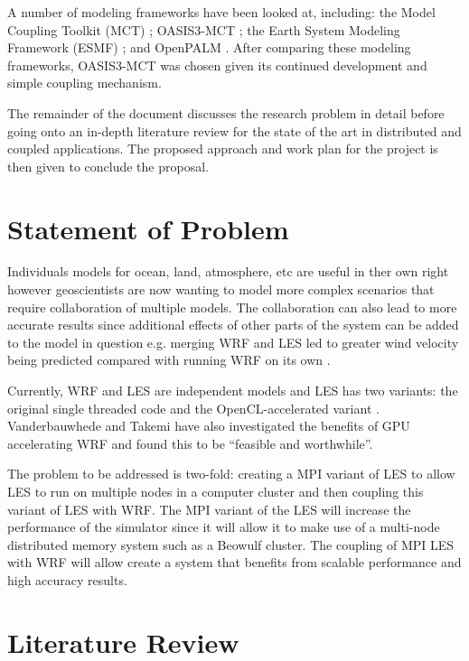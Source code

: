\documentclass{acm_proc_article-sp}
\renewcommand{\_}{\underscore\hspace{0pt}}
\begin{document}
A number of modeling frameworks have been looked at, including: the Model
Coupling Toolkit (MCT) \cite{Larson2005}; OASIS3-MCT \cite{Valcke,Valcke2013};
the Earth System Modeling Framework (ESMF) \cite{Ramework2004}; and OpenPALM
\cite{Piacentini2011}. After comparing these modeling frameworks, OASIS3-MCT was
chosen given its continued development and simple coupling mechanism.

The remainder of the document discusses the research problem in detail before
going onto an in-depth literature review for the state of the art in distributed
and coupled applications. The proposed approach and work plan for the project is
then given to conclude the proposal.

\section*{Statement of Problem}

Individuals models for ocean, land, atmosphere, etc are useful in ther own right
however geoscientists are now wanting to model more complex scenarios that
require collaboration of multiple models. The collaboration can also lead to
more accurate results since additional effects of other parts of the system can
be added to the model in question e.g. merging WRF and LES led to greater wind
velocity being predicted compared with running WRF on its own
\cite{Kinbara2010,Nakayama1998}.

Currently, WRF and LES are independent models and LES has two variants: the
original single threaded code and the OpenCL-accelerated variant
\cite{Vanderbauwhede2014}. Vanderbauwhede and Takemi \cite{Vanderbauwhede2013}
have also investigated the benefits of GPU accelerating WRF and found this to be
``feasible and worthwhile''.

The problem to be addressed is two-fold: creating a MPI variant of LES to allow
LES to run on multiple nodes in a computer cluster and then coupling this
variant of LES with WRF. The MPI variant of the LES will increase the
performance of the simulator since it will allow it to make use of a multi-node
distributed memory system such as a Beowulf cluster. The coupling of MPI LES
with WRF will allow create a system that benefits from scalable performance and
high accuracy results.

\section*{Literature Review}
\end{document}
